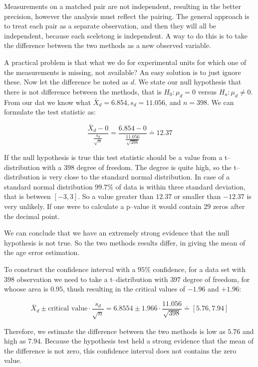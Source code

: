 Measurements on a matched pair are not independent, resulting in the better
precision, however the analysis must reflect the pairing. The general approach
is to treat each pair as a separate observation, and then they will all be
independent, because each sceletong is independent. A way to do this is to
take the difference between the two methods as a new observed variable.

A practical problem is that what we do for experimental units for which one of
the measurements is missing, not available? An easy solution is to just ignore
these. Now let the difference be noted as $d$. We state our null hypothesis that
there is not difference between the methods, that is $H_0: \mu_d=0$ versus
$H_a: \mu_d \neq 0$. From our dat we know what $\bar{X}_d=6.854, s_d = 11.056$,
and $n=398$. We can formulate the test statistic as:

\[ \frac{\bar{X}_d - 0}{\frac{s_d}{\sqrt{n}}} = \frac{6.854 -
		0}{\frac{11.056}{\sqrt{398}}} \doteq 12.37
\]

If the null hypothesis is true this test statistic should be a value from a
t--distribution with a $398$ degree of freedom. The degree is quite high, so the
t--distribution is very close to the standard normal distribution. In case of a
standard normal distribution $99.7\%$ of data is within three standard
deviation, that is between $[-3,3]$. So a value greater than $12.37$ or smaller
than $-12.37$ is very unlikely. If one were to calculate a p--value it would
contain $29$ zeros after the decimal point.

We can conclude that we have an extremely strong evidence that the null
hypothesis is not true. So the two methods results differ, in giving the mean of
the age error estimation.

To construct the confidence interval with a $95\%$ confidence, for a data set
with $398$ observation we need to take a t--distribution with $397$ degree of
freedom, for whoose area is $0.95$, thush resulting in the critical values of
$-1.96$ and $+1.96$:

\[ \bar{X}_d \pm \mbox{critical value} \cdot
	\frac{s_d}{\sqrt{n}} = 6.8554 \pm 1.966 \cdot \frac{11.056}{\sqrt{398}} \doteq
	[5.76, 7.94 ] \]

Therefore, we estimate the difference between the two methods is low as $5.76$
and high as $7.94$. Because the hypothesis test held a strong evidence that the
mean of the difference is not zero, this confidence interval does not contains
the zero value.

